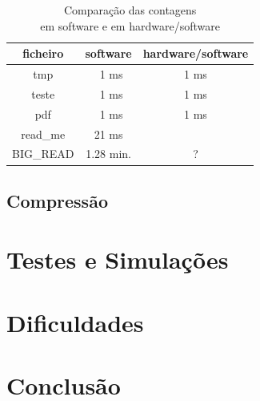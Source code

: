 \documentclass[a4paper]{article}
\begin{document}
	\begin{table}
		\centering
		\caption{Comparação das contagens \\em software e em hardware/software}

		\begin{tabular}{|c|c|c|}
			\hline
			ficheiro   & software   & hardware/software \\ \hline \hline
			tmp        & \ 1 ms     & 1 ms         \\ \hline
			teste      & \ 1 ms     & 1 ms         \\ \hline
			pdf        & \ 1 ms     & 1 ms         \\ \hline
			read\_me   & 21 ms      &           \\ \hline
			BIG\_READ  & 1.28 min.  & ?         \\
			\hline
		\end{tabular}
		\label{tab:time_hardware}
	\end{table}


	\subsection{Compressão}

	\section{Testes e Simulações}

	\section{Dificuldades}

	\section{Conclusão}


\end{document}
